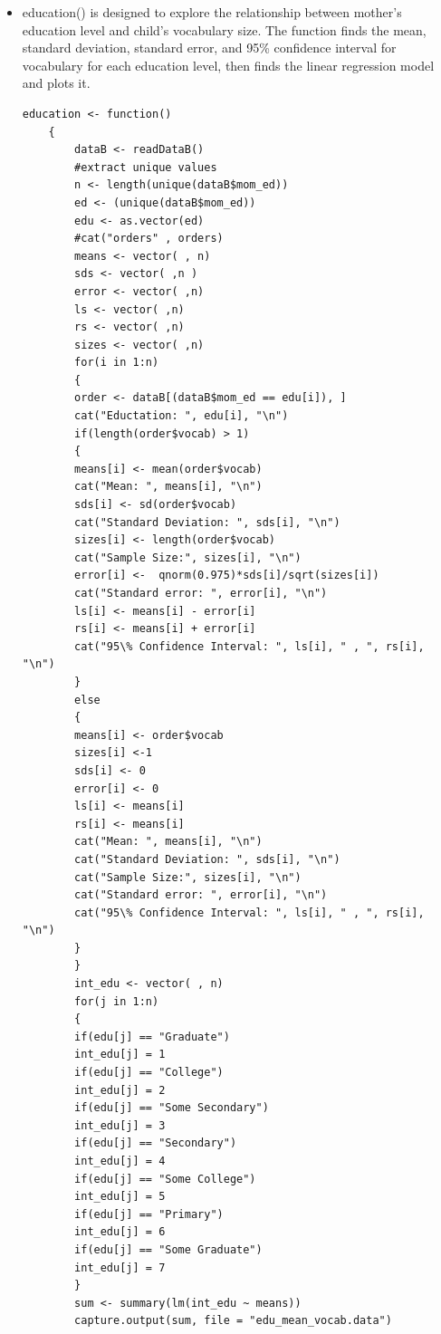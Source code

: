 \documentclass[11pt]{article}  %
\begin{document}
\begin{itemize}
\begin{lstlisting}[basicstyle=\small]
        means_order <- ggplot() + aes(x =int_eth, y = means) + geom_point(shape = 1)
            + geom_smooth(method = lm, se=TRUE)
            + labs(title = "Linear Model for Ethnicity
                and Average Vocabulary",
            x = "Ethnicity as Integer", y = "Average Vocabulary")
        ggsave(means_order, file="means_ethn.png")
        
        }
    }
    \end{lstlisting}
    
    \label{sec:EDU}
    \item education() is designed to explore the relationship between mother's education level and child's vocabulary size. The function finds the mean, standard deviation, standard error, and 95\% confidence interval for vocabulary for each education level, then finds the linear regression model and plots it.
    \begin{lstlisting}[basicstyle=\small]
    education <- function()
    {
        dataB <- readDataB()
        #extract unique values
        n <- length(unique(dataB$mom_ed))
        ed <- (unique(dataB$mom_ed))
        edu <- as.vector(ed)
        #cat("orders" , orders)
        means <- vector( , n)
        sds <- vector( ,n )
        error <- vector( ,n)
        ls <- vector( ,n)
        rs <- vector( ,n)
        sizes <- vector( ,n)
        for(i in 1:n)
        {
        order <- dataB[(dataB$mom_ed == edu[i]), ]
        cat("Eductation: ", edu[i], "\n")
        if(length(order$vocab) > 1)
        {
        means[i] <- mean(order$vocab)
        cat("Mean: ", means[i], "\n")
        sds[i] <- sd(order$vocab)
        cat("Standard Deviation: ", sds[i], "\n")
        sizes[i] <- length(order$vocab)
        cat("Sample Size:", sizes[i], "\n")
        error[i] <-  qnorm(0.975)*sds[i]/sqrt(sizes[i])
        cat("Standard error: ", error[i], "\n")
        ls[i] <- means[i] - error[i]
        rs[i] <- means[i] + error[i]
        cat("95\% Confidence Interval: ", ls[i], " , ", rs[i], "\n")
        }
        else
        {
        means[i] <- order$vocab
        sizes[i] <-1
        sds[i] <- 0
        error[i] <- 0
        ls[i] <- means[i]
        rs[i] <- means[i]
        cat("Mean: ", means[i], "\n")
        cat("Standard Deviation: ", sds[i], "\n")
        cat("Sample Size:", sizes[i], "\n")
        cat("Standard error: ", error[i], "\n")
        cat("95\% Confidence Interval: ", ls[i], " , ", rs[i], "\n")
        }
        }
        int_edu <- vector( , n)
        for(j in 1:n)
        {
        if(edu[j] == "Graduate")
        int_edu[j] = 1
        if(edu[j] == "College")
        int_edu[j] = 2
        if(edu[j] == "Some Secondary")
        int_edu[j] = 3
        if(edu[j] == "Secondary")
        int_edu[j] = 4
        if(edu[j] == "Some College")
        int_edu[j] = 5
        if(edu[j] == "Primary")
        int_edu[j] = 6
        if(edu[j] == "Some Graduate")
        int_edu[j] = 7
        }
        sum <- summary(lm(int_edu ~ means))
        capture.output(sum, file = "edu_mean_vocab.data")
        

\end{lstlisting}
\end{itemize}
\end{document}
